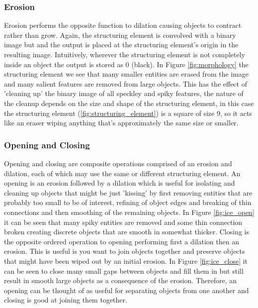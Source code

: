 \subsubsection{Erosion}

Erosion performs the opposite function to dilation causing objects to contract rather than grow. Again, the structuring element is convolved with a binary image but and the output is placed at the structuring element's origin in the resulting image. Intuitively, wherever the structuring element is not completely inside an object the output is stored as 0 (black). In Figure \ref{fig:morphology} the structuring element we see that many smaller entities are erased from the image and many salient features are removed from large objects. This has the effect of 'cleaning up' the binary image of all speckley and spiky features, the nature of the cleanup depends on the size and shape of the structuring element, in this case the structuring element (\ref{fig:structuring_element}) is a square of size 9, so it acts like an eraser wiping anything that's approximately the same size or smaller.


\subsubsection{Opening and Closing}

Opening and closing are composite operations comprised of an erosion and dilation, each of which may use the same or different structuring element. An opening is an erosion followed by a dilation which is useful for isolating and cleaning up objects that might be just 'kissing' by first removing entities that are probably too small to be of interest, refining of object edges and breaking of thin connections and then smoothing of the remaining objects. In Figure \ref{fig:ice_open} it can be seen that many spiky entities are removed and some thin connection broken creating discrete objects that are smooth in somewhat thicker. Closing is the opposite ordered operation to opening performing first a dilation then an erosion. This is useful is you want to join objects together and preserve objects that might have been wiped out by an initial erosion. In Figure \ref{fig:ice_close} it can be seen to close many small gaps between objects and fill them in but still result in smooth large objects as a consequence of the erosion. Therefore, an opening can be thought of as useful for separating objects from one another and closing is good at joining them together. 

